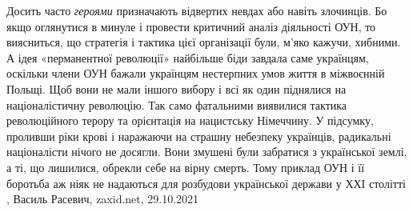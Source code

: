 Досить часто \emph{героями} призначають відвертих невдах або навіть злочинців. Бо якщо
оглянутися в минуле і провести критичний аналіз діяльності ОУН, то виясниться,
що стратегія і тактика цієї організації були, м’яко кажучи, хибними. А ідея
«перманентної революції» найбільше біди завдала саме українцям, оскільки члени
ОУН бажали українцям нестерпних умов життя в міжвоєнній Польщі. Щоб вони не
мали іншого вибору і всі як один піднялися на націоналістичну революцію. Так
само фатальними виявилися тактика революційного терору та орієнтація на
нацистську Німеччину. У підсумку, проливши ріки крові і наражаючи на страшну
небезпеку українців, радикальні націоналісти нічого не досягли. Вони змушені
були забратися з української землі, а ті, що лишилися, обрекли себе на вірну
смерть. Тому приклад ОУН і її боротьба аж ніяк не надаються для розбудови
української держави у ХХІ столітті
, 
Василь Расевич, zaxid.net, 29.10.2021
